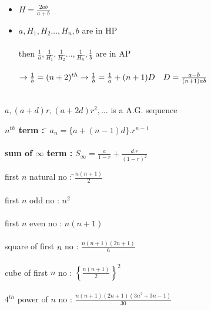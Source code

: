 \documentclass[11pt,a4paper,landscape]{article}
\begin{document}
\begin{multicols}{3}
\begin{itemize}
	\item $H = \frac{2ab}{a+b}$
	\item $a,H_1,H_2 \ldots,H_n,b$ are in HP\\ \\
		then $\frac{1}{a},\frac{1}{H_1},\frac{1}{H_2} \ldots,\frac{1}{H_n},\frac{1}{b}$ are in AP\\ \\
		$\rightarrow \frac{1}{b} = (n+2)^{th} \\ \\ \rightarrow \frac{1}{b} = \frac{1}{a}+(n+1)D \quad D =\frac{a-b}{(n+1)ab\\ \\}$
\end{itemize}

{\bfseries {}}\\
$a,(a+d)r,(a+2d)r^2,\ldots$ is a A.G. sequence
\begin{tabbing}
{\bfseries $n^{th}$ term :} \hspace{15mm} \= $a_n = \{a+(n-1)d\}.r^{n-1}$ \\ \\
{\bfseries sum of  $\infty$ term :} \>$S_{\infty} = \frac{a}{1-r}+\frac{d.r}{{(1-r)}^{2}}$ \\
\end{tabbing}

{\bfseries {}}
\begin{tabbing}
first $n$ natural no : \hspace{5mm}\=$\frac{n(n+1)}{2}$\\ \\
first $n$ odd no : \> $n^2$\\ \\
first $n$ even no : \> $n(n+1)$\\ \\
square of first $n$ no : \> $\frac{n(n+1)(2n+1)}{6}$\\ \\
cube of first $n$ no : \> ${\left \{ \frac{n(n+1)}{2} \right \} }^2$\\\\
$4^{th}$ power of $n$ no : \> $\frac{n(n+1)(2n+1)(3n^{2}+3n-1)}{30}$

\end{tabbing}
\end{multicols}
\pagebreak
\end{document}
